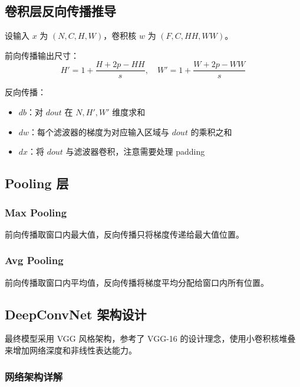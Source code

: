 \documentclass[a4paper]{article}
\begin{document}
\subsection{卷积层反向传播推导}

设输入 $x$ 为 $(N, C, H, W)$，卷积核 $w$ 为 $(F, C, HH, WW)$。

前向传播输出尺寸：
\begin{equation}
H' = 1 + \frac{H + 2p - HH}{s}, \quad W' = 1 + \frac{W + 2p - WW}{s}
\end{equation}

反向传播：
\begin{itemize}
    \item $db$：对 $dout$ 在 $N, H', W'$ 维度求和
    \item $dw$：每个滤波器的梯度为对应输入区域与 $dout$ 的乘积之和
    \item $dx$：将 $dout$ 与滤波器卷积，注意需要处理 padding
\end{itemize}

\subsection{Pooling 层}

\subsubsection{Max Pooling}

前向传播取窗口内最大值，反向传播只将梯度传递给最大值位置。

\subsubsection{Avg Pooling}

前向传播取窗口内平均值，反向传播将梯度平均分配给窗口内所有位置。

\subsection{DeepConvNet 架构设计}

最终模型采用 VGG 风格架构，参考了 VGG-16 的设计理念，使用小卷积核堆叠来增加网络深度和非线性表达能力。

\subsubsection{网络架构详解}
\end{document}
